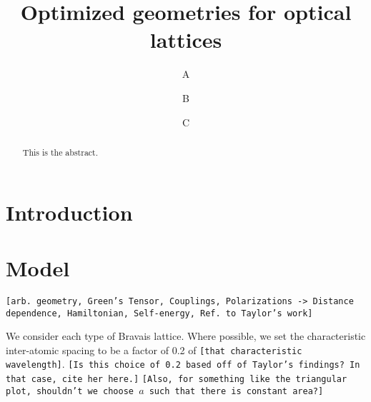 \documentclass[aps,pra,superscriptaddress,twocolumn]{revtex4-1}
\newcommand{\eg}{e.\,g.,\ }
\newcommand{\fref}[1]{\text{Fig.}~\ref{#1}}
\newcommand{\eeref}[1]{\text{Eqs.}~\eqref{#1}}
\newcommand{\commentSB}[1]{\texttt{\color{blue}[#1]}}
\newcommand{\commentSO}[1]{\texttt{\color{orange}[#1]}}
\begin{document}
\title{Optimized geometries for optical lattices}
\author{A}
\author{B}
\author{C}

\begin{abstract}

This is the abstract. 

\end{abstract}

\maketitle

\section{Introduction}





\section{Model}
\commentSO{arb. geometry, Green's Tensor, Couplings, Polarizations -> Distance dependence, Hamiltonian, Self-energy, Ref. to Taylor's work}

We consider each type of Bravais lattice. Where possible, we set the characteristic inter-atomic spacing to be a factor of 0.2 of \commentSB{that characteristic wavelength}.
\commentSB{Is this choice of 0.2 based off of Taylor's findings? In that case, cite her here.}
\commentSB{Also, for something like the triangular plot, shouldn't we choose $a$ such that there is constant area?} 
\end{document}
